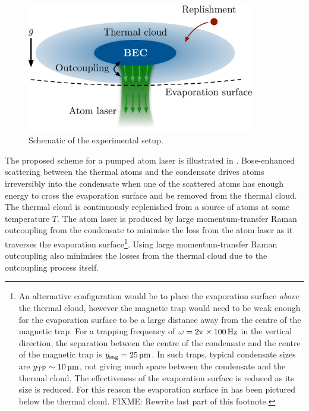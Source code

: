 \begin{figure}
    \centering
        \includegraphics[width=10cm]{QKTScheme}
    \caption{Schematic of the experimental setup.}
    \label{KineticTheory:QKTScheme}
\end{figure}

The proposed scheme for a pumped atom laser is illustrated in . Bose-enhanced scattering between the thermal atoms and the condensate drives atoms irreversibly into the condensate when one of the scattered atoms has enough energy to cross the evaporation surface and be removed from the thermal cloud. The thermal cloud is continuously replenished from a source of atoms at some temperature $T$. The atom laser is produced by large momentum-transfer Raman outcoupling from the condensate to minimise the loss from the atom laser as it traverses the evaporation surface\footnote{An alternative configuration would be to place the evaporation surface \emph{above} the thermal cloud, however the magnetic trap would need to be weak enough for the evaporation surface to be a large distance away from the centre of the magnetic trap. For a trapping frequency of $\omega = 2\pi \times \unit[100]{Hz}$ in the vertical direction, the separation between the centre of the condensate and the centre of the magnetic trap is $y_\text{sag} = \unit[25]{\micro m}$. In such traps, typical condensate sizes are $y_\text{TF} \sim \unit[10]{\micro m}$, not giving much space between the condensate and the thermal cloud. The effectiveness of the evaporation surface is reduced as its size is reduced. For this reason the evaporation surface in  has been pictured below the thermal cloud. FIXME: Rewrite last part of this footnote.}. Using large momentum-transfer Raman outcoupling also minimises the losses from the thermal cloud due to the outcoupling process itself.

